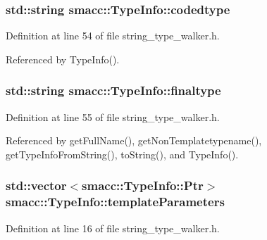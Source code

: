 \subsubsection[{\texorpdfstring{codedtype}{codedtype}}]{\setlength{\rightskip}{0pt plus 5cm}std\+::string smacc\+::\+Type\+Info\+::codedtype\hspace{0.3cm}{\ttfamily [private]}}\hypertarget{classsmacc_1_1TypeInfo_acdd24c44f12bccdaba8d8c52c9e6d47c}{}\label{classsmacc_1_1TypeInfo_acdd24c44f12bccdaba8d8c52c9e6d47c}


Definition at line 54 of file string\+\_\+type\+\_\+walker.\+h.



Referenced by Type\+Info().

\subsubsection[{\texorpdfstring{finaltype}{finaltype}}]{\setlength{\rightskip}{0pt plus 5cm}std\+::string smacc\+::\+Type\+Info\+::finaltype\hspace{0.3cm}{\ttfamily [private]}}\hypertarget{classsmacc_1_1TypeInfo_ae01f09534a045d2f097a62e9c87cae3d}{}\label{classsmacc_1_1TypeInfo_ae01f09534a045d2f097a62e9c87cae3d}


Definition at line 55 of file string\+\_\+type\+\_\+walker.\+h.



Referenced by get\+Full\+Name(), get\+Non\+Templatetypename(), get\+Type\+Info\+From\+String(), to\+String(), and Type\+Info().

\subsubsection[{\texorpdfstring{template\+Parameters}{templateParameters}}]{\setlength{\rightskip}{0pt plus 5cm}std\+::vector$<${\bf smacc\+::\+Type\+Info\+::\+Ptr}$>$ smacc\+::\+Type\+Info\+::template\+Parameters}\hypertarget{classsmacc_1_1TypeInfo_af50766217e1dcb5c25253c94affd6518}{}\label{classsmacc_1_1TypeInfo_af50766217e1dcb5c25253c94affd6518}


Definition at line 16 of file string\+\_\+type\+\_\+walker.\+h.

